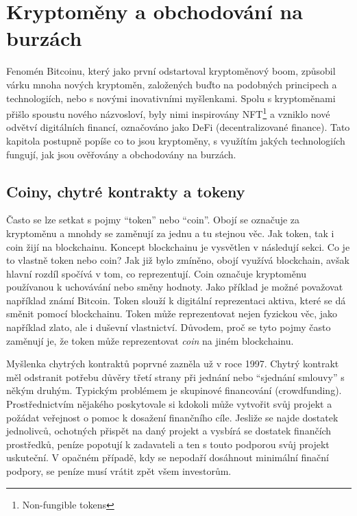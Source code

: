 \chapter{Kryptoměny a obchodování na burzách}
\label{sec:CryptoAndTrading}

Fenomén Bitcoinu, který jako první odstartoval kryptoměnový boom, způsobil várku mnoha nových
kryptoměn, založených buďto na podobných principech a technologiích, nebo s novými inovativními myšlenkami.
Spolu s kryptoměnami přišlo spoustu nového názvosloví, byly nimi inspirovány NFT\footnote{Non-fungible tokens} a vzniklo
nové odvětví digitálních financí, označováno jako DeFi (decentralizované finance).
Tato kapitola postupně popíše co to jsou kryptoměny, s využítím jakých technologiích fungují, jak jsou ověřovány
a obchodovány na burzách.


\section{Coiny, chytré kontrakty a tokeny}
\label{sec:CoinsTokensSmartContracts}
Často se lze setkat s pojmy \enquote{token} nebo \enquote{coin}. Obojí se označuje za kryptoměnu a mnohdy se zaměnují
za jednu a tu stejnou věc. Jak token, tak i coin žijí na blockchainu.
Koncept blockchainu je vysvětlen v následují sekci. Co je to vlastně token nebo coin? Jak již bylo zmíněno, obojí využívá
blockchain, avšak hlavní rozdíl spočívá v tom, co reprezentují. Coin označuje kryptoměnu používanou k uchovávání
nebo směny hodnoty. Jako příklad je možné považovat například známí Bitcoin. Token slouží k digitální reprezentaci
aktiva, které se dá směnit pomocí blockchainu. Token může reprezentovat nejen fyzickou věc, jako například zlato, ale i
duševní vlastnictví. Důvodem, proč se tyto pojmy často zaměnují je, že token může reprezentovat \emph{coin} na jiném blockchainu.

Myšlenka chytrých kontraktů poprvné zazněla už v roce 1997. Chytrý kontrakt měl odstranit potřebu důvěry třetí strany při
jednání nebo \enquote{sjednání smlouvy} s někým druhým. Typickým problémem je skupinové financování (crowdfunding). Prostřednictvím
nějakého poskytovale si kdokoli může vytvořit svůj projekt a požádat veřejnost o pomoc k dosažení finančního cíle. Jesliže se najde dostatek
jednolivců, ochotných přispět na daný projekt a vysbírá se dostatek finančích prostředků, peníze popotují k zadavateli a ten s touto podporou
svůj projekt uskuteční. V opačném případě, kdy se nepodaří dosáhnout minimální finační podpory, se peníze musí vrátit zpět všem investorům.

